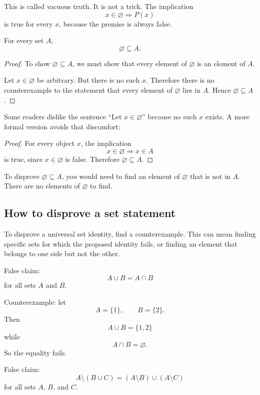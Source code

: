 This is called vacuous truth. It is not a trick. The implication
\[
x\in\varnothing\Rightarrow P(x)
\]
is true for every $x$, because the premise is always false.

\begin{theorem}
For every set $A$,
\[
\varnothing\subseteq A.
\]
\end{theorem}

\begin{proof}
To show $\varnothing\subseteq A$, we must show that every element of $\varnothing$ is an element of $A$.

Let $x\in\varnothing$ be arbitrary. But there is no such $x$. Therefore there is no counterexample to the statement that every element of $\varnothing$ lies in $A$. Hence $\varnothing\subseteq A$.
\end{proof}

Some readers dislike the sentence ``Let $x\in\varnothing$'' because no such $x$ exists. A more formal version avoids that discomfort:

\begin{proof}
For every object $x$, the implication
\[
x\in\varnothing\Rightarrow x\in A
\]
is true, since $x\in\varnothing$ is false. Therefore $\varnothing\subseteq A$.
\end{proof}

\begin{intuitionbox}
To disprove $\varnothing\subseteq A$, you would need to find an element of $\varnothing$ that is not in $A$. There are no elements of $\varnothing$ to find.
\end{intuitionbox}

\subsection{How to disprove a set statement}

To disprove a universal set identity, find a counterexample. This can mean finding specific sets for which the proposed identity fails, or finding an element that belongs to one side but not the other.

False claim:
\[
A\cup B=A\cap B
\]
for all sets $A$ and $B$.

Counterexample: let
\[
A=\{1\},\qquad B=\{2\}.
\]
Then
\[
A\cup B=\{1,2\}
\]
while
\[
A\cap B=\varnothing.
\]
So the equality fails.

False claim:
\[
A\setminus(B\cup C)=(A\setminus B)\cup(A\setminus C)
\]
for all sets $A$, $B$, and $C$.

